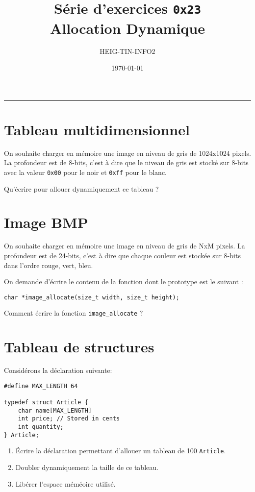 



\date{\today}
\author{HEIG-TIN-INFO2}
\title{Série d'exercices \texttt{0x23} \\ \textbf{Allocation Dynamique}}
\maketitle

\noindent\rule{\textwidth}{.3pt}

\begin{multicols}{2}

\section{Tableau multidimensionnel}

On souhaite charger en mémoire une image en niveau de gris de 1024x1024 pixels. La profondeur est de 8-bits, c'est à dire que le niveau de gris est stocké sur 8-bits avec la valeur \lstinline{0x00} pour le noir et \lstinline{0xff} pour le blanc. 

Qu'écrire pour allouer dynamiquement ce tableau ?

\section{Image BMP}

On souhaite charger en mémoire une image en niveau de gris de NxM pixels. La profondeur est de 24-bits, c'est à dire que chaque couleur est stockée sur 8-bits dans l'ordre rouge, vert, bleu. 

On demande d'écrire le contenu de la fonction dont le prototype est le suivant :  

\begin{lstlisting}
char *image_allocate(size_t width, size_t height);
\end{lstlisting}

Comment écrire la fonction \lstinline{image_allocate} ?

\section{Tableau de structures}

Considérons la déclaration suivante:

\begin{lstlisting}
#define MAX_LENGTH 64

typedef struct Article {
    char name[MAX_LENGTH]
    int price; // Stored in cents
    int quantity;    
} Article;
\end{lstlisting}
    
\begin{enumerate}[label=(\roman*)]
    \item Écrire la déclaration permettant d'allouer un tableau de 100 \lstinline{Article}.
    \item Doubler dynamiquement la taille de ce tableau.
    \item Libérer l'espace méméoire utilisé.
\end{enumerate}

\end{multicols}


